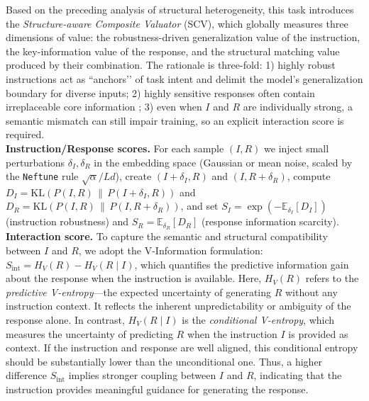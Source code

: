 \documentclass[12pt,a4paper]{article}
\begin{document}
Based on the preceding analysis of structural heterogeneity, this task introduces the \emph{Structure-aware Composite Valuator} (SCV), which globally measures three dimensions of value: the robustness-driven generalization value of the instruction, the key-information value of the response, and the structural matching value produced by their combination. The rationale is three-fold: 1) highly robust instructions act as “anchors’’ of task intent and delimit the model’s generalization boundary for diverse inputs; 2) highly sensitive responses often contain irreplaceable core information \cite{DBLP:conf/icml/XiaMGA024}; 3) even when $I$ and $R$ are individually strong, a semantic mismatch can still impair training, so an explicit interaction score is required.\\
\textbf{Instruction/Response scores.} For each sample $(I,R)$ we inject small perturbations $\delta_I,\delta_R$ in the embedding space (Gaussian or mean noise, scaled by the \texttt{Neftune} rule $\sqrt{\alpha}/Ld$), create $(I+\delta_I,R)$ and $(I,R+\delta_R)$, compute $D_I=\mathrm{KL}(P(I,R)\,\|\,P(I+\delta_I,R))$ and $D_R=\mathrm{KL}(P(I,R)\,\|\,P(I,R+\delta_R))$, and set $S_I=\exp(-\mathbb{E}_{\delta_I}[D_I])$ (instruction robustness) and $S_R=\mathbb{E}_{\delta_R}[D_R]$ (response information scarcity).\\
\textbf{Interaction score.} To capture the semantic and structural compatibility between $I$ and $R$, we adopt the V-Information formulation: $S_{\text{int}} = H_V(R) - H_V(R \mid I)$, which quantifies the predictive information gain about the response when the instruction is available. Here, $H_V(R)$ refers to the \emph{predictive V-entropy}—the expected uncertainty of generating $R$ without any instruction context. It reflects the inherent unpredictability or ambiguity of the response alone. In contrast, $H_V(R \mid I)$ is the \emph{conditional V-entropy}, which measures the uncertainty of predicting $R$ when the instruction $I$ is provided as context. If the instruction and response are well aligned, this conditional entropy should be substantially lower than the unconditional one. Thus, a higher difference $S_{\text{int}}$ implies stronger coupling between $I$ and $R$, indicating that the instruction provides meaningful guidance for generating the response.\\
\end{document}
